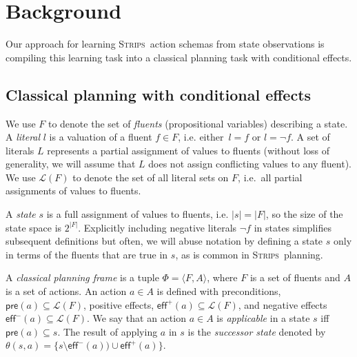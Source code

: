 \documentclass{article}
\newcommand{\tup}[1]{{\langle #1 \rangle}}
\newcommand{\pre}{\mathsf{pre}}     %
\newcommand{\eff}{\mathsf{eff}}     %
\newcommand{\strips}{\textsc{Strips}}     %
\begin{document}


\section{Background}
\label{background}

Our approach for learning \strips\ action schemas from state observations is compiling this learning task into a classical planning task with conditional effects.

\subsection{Classical planning with conditional effects}
We use $F$ to denote the set of {\em fluents} (propositional variables) describing a state. A {\em literal} $l$ is a valuation of a fluent $f\in F$, i.e. either~$l=f$ or $l=\neg f$. A set of literals $L$ represents a partial assignment of values to fluents (without loss of generality, we will assume that $L$ does not assign conflicting values to any fluent). We use $\mathcal{L}(F)$ to denote the set of all literal sets on $F$, i.e.~all partial assignments of values to fluents.

A {\em state} $s$ is a full assignment of values to fluents, i.e. $|s|=|F|$, so the size of the state space is $2^{|F|}$. Explicitly including negative literals $\neg f$ in states simplifies subsequent definitions but often, we will abuse notation by defining a state $s$ only in terms of the fluents that are true in $s$, as is common in \strips\ planning.

A {\em classical planning frame} is a tuple $\Phi=\tup{F,A}$, where $F$ is a set of fluents and $A$ is a set of actions. An action $a\in A$ is defined with preconditions, $\pre(a)\subseteq\mathcal{L}(F)$, positive effects, $\eff^+(a)\subseteq\mathcal{L}(F)$, and negative effects $\eff^-(a)\subseteq\mathcal{L}(F)$. We say that an action $a\in A$ is {\em applicable} in a state $s$ iff $\pre(a)\subseteq s$. The result of applying $a$ in $s$ is the {\em successor state} denoted by $\theta(s,a)=\{s\setminus\eff^-(a))\cup\eff^+(a)\}$.
\end{document}
